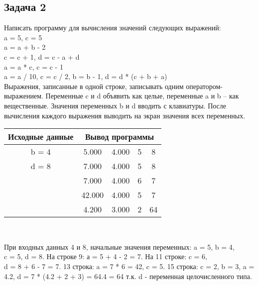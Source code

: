 \documentclass[a4paper,14pt]{extarticle}
\begin{document}
\subsection{Задача 2} 
Написать программу для вычисления значений следующих выражений:\\
a = 5, c = 5\\
a = a + b - 2\\
c = c + 1, d = c - a + d\\
a = a  * c, c = c - 1\\
a = a / 10, c = c / 2, b = b - 1, d = d * (c + b + a)\\
Выражения, записанные в одной строке, записывать одним оператором-выражением. Переменные c и d объявить как целые, переменные a и b – как вещественные. Значения переменных b и d вводить с клавиатуры. После вычисления каждого выражения выводить на экран значения всех переменных.

\begin{center}
\begin{tabular}{|c|cccc|}
\hline
Исходные данные & \multicolumn{4}{|c|}{Вывод программы}\\
\hline
b = 4 & 5.000  & 4.000 & 5 & 8 \\
d = 8 & 7.000  & 4.000 & 5 & 8 \\
& 7.000  & 4.000 & 6 & 7 \\
& 42.000 & 4.000 & 5 & 7 \\
& 4.200  & 3.000 & 2 & 64 \\
\hline
\end{tabular}\\
\end{center}
При входных данных 4 и 8, начальные значения переменных: a = 5, b = 4,\\ c = 5, d = 8. На строке 9: а = 5 + 4 - 2 = 7. На 11 строке: c = 6,\\ d = 8 + 6 - 7 = 7. 13 строка: a = 7 * 6 = 42, c = 5. 15 строка: c = 2, b = 3, a = 4.2, d = 7 * (4.2 + 2 + 3) = 64.4 = 64 т.к. d - переменная целочисленного типа.
\end{document}
